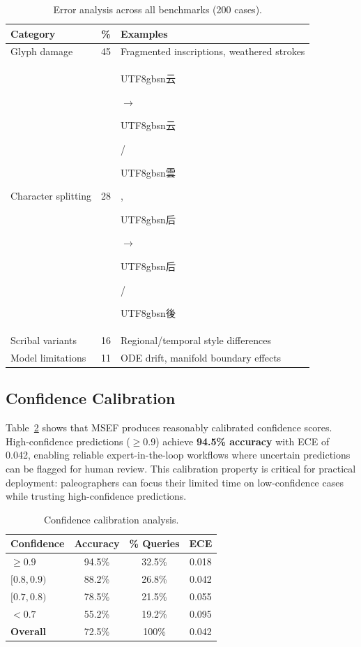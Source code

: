 \documentclass{article}
\newcommand{\cg}[1]{\begin{CJK*}{UTF8}{gbsn}#1\end{CJK*}}
\begin{document}
\begin{table}[t]
\centering
\small
\caption{Error analysis across all benchmarks (200 cases).}
\label{tab:error_analysis}
\begin{tabular}{lcp{4cm}}
\toprule
\textbf{Category} & \textbf{\%} & \textbf{Examples} \\
\midrule
Glyph damage & 45 & Fragmented inscriptions, weathered strokes \\
Character splitting & 28 & \cg{云}$\to$\cg{云}/\cg{雲}, \cg{后}$\to$\cg{后}/\cg{後} \\
Scribal variants & 16 & Regional/temporal style differences \\
Model limitations & 11 & ODE drift, manifold boundary effects \\
\bottomrule
\end{tabular}
\end{table}



\subsection{Confidence Calibration}
\label{app:confidence}
Table~\ref{tab:confidence} shows that MSEF produces reasonably calibrated confidence scores. High-confidence predictions ($\geq$0.9) achieve \textbf{94.5\% accuracy} with ECE of 0.042, enabling reliable expert-in-the-loop workflows where uncertain predictions can be flagged for human review. This calibration property is critical for practical deployment: paleographers can focus their limited time on low-confidence cases while trusting high-confidence predictions.

\begin{table}[t]
\centering
\small
\caption{Confidence calibration analysis.}
\label{tab:confidence}
\begin{tabular}{lccc}
\toprule
\textbf{Confidence} & \textbf{Accuracy} & \textbf{\% Queries} & \textbf{ECE} \\
\midrule
$\geq 0.9$ & 94.5\% & 32.5\% & 0.018 \\
$[0.8, 0.9)$ & 88.2\% & 26.8\% & 0.042 \\
$[0.7, 0.8)$ & 78.5\% & 21.5\% & 0.055 \\
$< 0.7$ & 55.2\% & 19.2\% & 0.095 \\
\midrule
\textbf{Overall} & 72.5\% & 100\% & 0.042 \\
\bottomrule
\end{tabular}
\end{table}
\end{document}
